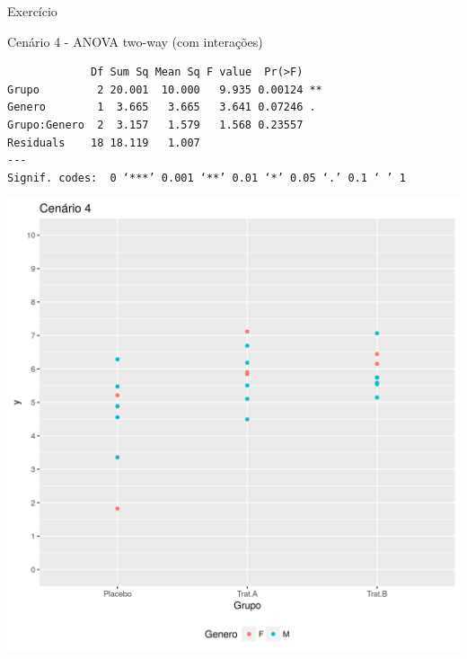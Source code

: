\documentclass{beamer}
\begin{document}
\begin{frame}[fragile]{Exercício}
  \begin{exampleblock}{Cenário 4 - ANOVA two-way (com interações)}
    \tiny
\begin{verbatim}
             Df Sum Sq Mean Sq F value  Pr(>F)   
Grupo         2 20.001  10.000   9.935 0.00124 **
Genero        1  3.665   3.665   3.641 0.07246 . 
Grupo:Genero  2  3.157   1.579   1.568 0.23557   
Residuals    18 18.119   1.007                   
---
Signif. codes:  0 ‘***’ 0.001 ‘**’ 0.01 ‘*’ 0.05 ‘.’ 0.1 ‘ ’ 1
\end{verbatim}
    \begin{center}
      \includegraphics[height=.5\textheight]{Cap13-30/cenario22}
    \end{center}
  \end{exampleblock}
\end{frame}
\end{document}
